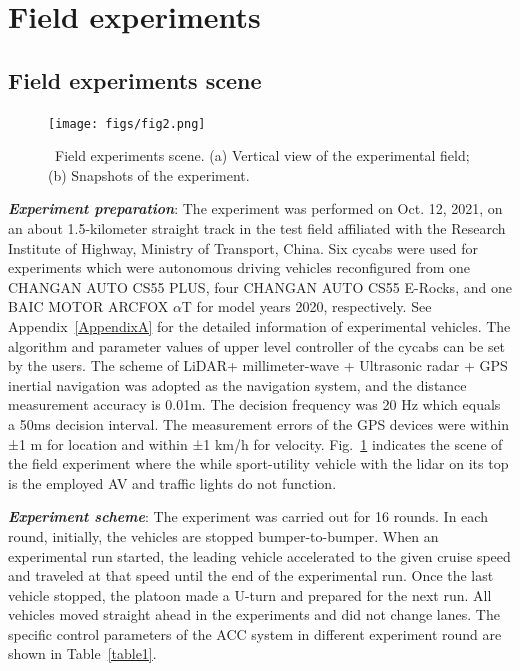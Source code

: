 \documentclass[a4paper]{cas-sc}
\begin{document}
\section{Field experiments}
\label{Section 3}

\subsection{Field experiments scene}
\label{Section 3.1}

\begin{figure}
  \centering
  \texttt{[image: figs/fig2.png]}
  \caption{~Field experiments scene. (a) Vertical view of the experimental field; (b) Snapshots of the experiment.}
  \label{fig2}
\end{figure}

\textbf{\emph{Experiment preparation}}: The experiment was performed on Oct. 12, 2021, on an about 1.5-kilometer straight track in the test field affiliated with the Research Institute of Highway, Ministry of Transport, China. Six cycabs were used for experiments which were autonomous driving vehicles reconfigured from one CHANGAN AUTO CS55 PLUS, four CHANGAN AUTO CS55 E-Rocks, and one BAIC MOTOR ARCFOX $\alpha$T for model years 2020, respectively. See Appendix~\ref{AppendixA} for the detailed information of experimental vehicles. The algorithm and parameter values of upper level controller of the cycabs can be set by the users. The scheme of LiDAR+ millimeter-wave + Ultrasonic radar + GPS inertial navigation was adopted as the navigation system, and the distance measurement accuracy is 0.01m. The decision frequency was 20 Hz which equals a 50ms decision interval. The measurement errors of the GPS devices were within ±1 m for location and within ±1 km/h for velocity. Fig.~\ref{fig2} indicates the scene of the field experiment where the while sport-utility vehicle with the lidar on its top is the employed AV and traffic lights do not function.

\textbf{\emph{Experiment scheme}}: The experiment was carried out for 16 rounds. In each round, initially, the vehicles are stopped bumper-to-bumper. When an experimental run started, the leading vehicle accelerated to the given cruise speed and traveled at that speed until the end of the experimental run. Once the last vehicle stopped, the platoon made a U-turn and prepared for the next run. All vehicles moved straight ahead in the experiments and did not change lanes. The specific control parameters of the ACC system in different experiment round are shown in Table~\ref{table1}.
\end{document}
